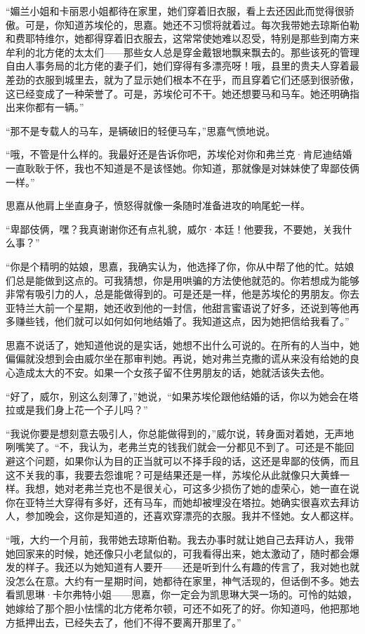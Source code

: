 \par “媚兰小姐和卡丽恩小姐都待在家里，她们穿着旧衣服，看上去还因此而觉得很骄傲。可是，你知道苏埃伦的，思嘉。她还不习惯将就着过。每次我带她去琼斯伯勒和费耶特维尔，她都得穿着旧衣服去，这常常使她难以忍受，特别是那些到南方来牟利的北方佬的太太们——那些女人总是穿金戴银地飘来飘去的。那些该死的管理自由人事务局的北方佬的妻子们，她们穿得有多漂亮呀！哦，县里的贵夫人穿着最差劲的衣服到城里去，就为了显示她们根本不在乎，而且穿着它们还感到很骄傲，这已经变成了一种荣誉了。可是，苏埃伦可不干。她还想要马和马车。她还明确指出来你都有一辆。”
\par “那不是专载人的马车，是辆破旧的轻便马车，”思嘉气愤地说。
\par “哦，不管是什么样的。我最好还是告诉你吧，苏埃伦对你和弗兰克·肯尼迪结婚一直耿耿于怀，我也不知道是不是该怪她。你知道，那就像是对妹妹使了卑鄙伎俩一样。”
\par 思嘉从他肩上坐直身子，愤怒得就像一条随时准备进攻的响尾蛇一样。
\par “卑鄙伎俩，嘿？我真谢谢你还有点礼貌，威尔·本廷！他要我，不要她，关我什么事？”
\par “你是个精明的姑娘，思嘉，我确实认为，他选择了你，你从中帮了他的忙。姑娘们总是能做到这点的。可我猜想，你是用哄骗的方法使他就范的。你若想成为能够非常有吸引力的人，总是能做得到的。可是还是一样，他是苏埃伦的男朋友。你去亚特兰大前一个星期，她还收到他的一封信，他甜言蜜语说了好多，还说到等他再多赚些钱，他们就可以如何如何地结婚了。我知道这点，因为她把信给我看了。”
\par 思嘉不说话了，她知道他说的是实话，她想不出什么可说的。在所有的人当中，她偏偏就没想到会由威尔坐在那审判她。再说，她对弗兰克撒的谎从来没有给她的良心造成太大的不安。如果一个女孩子留不住男朋友的话，她就活该失去他。
\par “好了，威尔，别这么刻薄了，”她说，“如果苏埃伦跟他结婚的话，你以为她会在塔拉或是我们身上花一个子儿吗？”
\par “我说你要是想刻意去吸引人，你总能做得到的，”威尔说，转身面对着她，无声地咧嘴笑了。“不，我认为，老弗兰克的钱我们就会一分都见不到了。可还是不能回避这个问题，如果你认为目的正当就可以不择手段的话，这还是卑鄙的伎俩，而且这不关我的事，我要去怨谁呢？可是结果还是一样，苏埃伦从此就像只大黄蜂一样。我想，她对老弗兰克也不是很关心，可这多少损伤了她的虚荣心，她一直在说你在亚特兰大穿得有多好，还有马车，而她却被埋没在塔拉。她确实很喜欢去拜访人，参加晚会，这你是知道的，还喜欢穿漂亮的衣服。我并不怪她。女人都这样。
\par “哦，大约一个月前，我带她去琼斯伯勒。我去办事时就让她自己去拜访人，我带她回家来的时候，她还像只小老鼠似的，可我看得出来，她太激动了，随时都会爆发的样子。我还以为她知道有人要开——还是听到什么有趣的传言了，我对她也就没怎么在意。大约有一星期时间，她都待在家里，神气活现的，但话倒不多。她去看凯思琳·卡尔弗特小姐——思嘉，你一定会为凯思琳大哭一场的。可怜的姑娘，她嫁给了那个胆小怯懦的北方佬希尔顿，可还不如死了的好。你知道吗，他把那地方抵押出去，已经失去了，他们不得不要离开那里了。”
